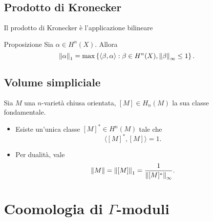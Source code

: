 \documentclass{beamer}
\begin{document}
\subsection{Prodotto di Kronecker}
\begin{frame}{\secname}{\subsecname}
Il prodotto di Kronecker è l'applicazione bilineare

\begin{block}{Proposizione}
Sia $\alpha\in H^n(X)$. Allora
\[
\left\lVert \alpha\right\rVert_1=\max\left\{\langle\beta,\alpha\rangle:\beta\in H^n(X),\left\lVert \beta\right\rVert_\infty\le 1\right\}.
\]
\end{block}
\end{frame}
\subsection{Volume simpliciale}
\begin{frame}{\secname}{\subsecname}
Sia $M$ una $n$-varietà chiusa orientata, $[M]\in H_n(M)$ la sua classe fondamentale.
\begin{itemize}
\item Esiste un'unica classe $[M]^*\in H^n(M)$ tale che
\[
\langle[M]^*,[M]\rangle=1.
\]
\item Per dualità, vale
\[
\left\lVert M\right\rVert=\left\lVert [M]\right\rVert_1=\frac{1}{\left\lVert [M]^*\right\rVert_\infty}.
\]
\end{itemize}
\end{frame}
\section{Coomologia di $\Gamma$-moduli}
\end{document}
